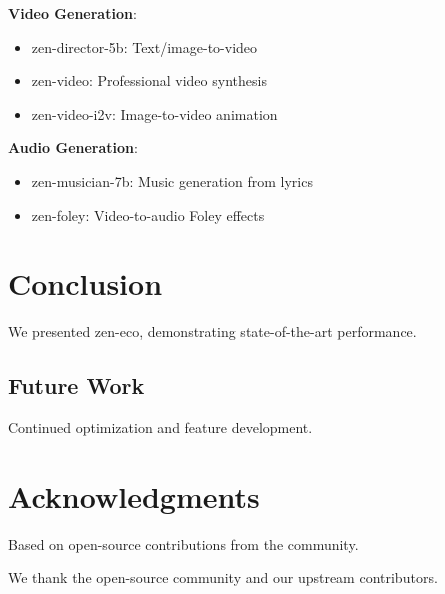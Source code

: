 \documentclass[11pt,a4paper]{article}
\begin{document}
\textbf{Video Generation}:
\begin{itemize}
    \item zen-director-5b: Text/image-to-video
    \item zen-video: Professional video synthesis
    \item zen-video-i2v: Image-to-video animation
\end{itemize}

\textbf{Audio Generation}:
\begin{itemize}
    \item zen-musician-7b: Music generation from lyrics
    \item zen-foley: Video-to-audio Foley effects
\end{itemize}

\section{Conclusion}

We presented zen-eco, demonstrating state-of-the-art performance.

\subsection{Future Work}
Continued optimization and feature development.

\section*{Acknowledgments}

Based on open-source contributions from the community.

We thank the open-source community and our upstream contributors.



\end{document}
